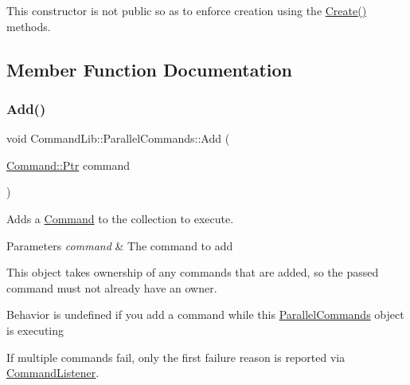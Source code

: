 This constructor is not public so as to enforce creation using the \mbox{\hyperlink{class_command_lib_1_1_parallel_commands_ab75ed6ec91fa1c4652a796a6c0f6868e}{Create()}} methods. 



\subsection{Member Function Documentation}
\mbox{\label{class_command_lib_1_1_parallel_commands_a36085841c237794fc8015ed400e552ad}} 
\subsubsection{\texorpdfstring{Add()}{Add()}}
{\footnotesize\ttfamily void Command\+Lib\+::\+Parallel\+Commands\+::\+Add (\begin{DoxyParamCaption}\item[{\mbox{\hyperlink{class_command_lib_1_1_command_a3b3e4f00144373299df5c6bb1acc319d}{Command\+::\+Ptr}}}]{command }\end{DoxyParamCaption})}



Adds a \mbox{\hyperlink{class_command_lib_1_1_command}{Command}} to the collection to execute.


\begin{DoxyParams}{Parameters}
{\em command} & The command to add\\
\hline
\end{DoxyParams}


This object takes ownership of any commands that are added, so the passed command must not already have an owner. 

Behavior is undefined if you add a command while this \mbox{\hyperlink{class_command_lib_1_1_parallel_commands}{Parallel\+Commands}} object is executing

If multiple commands fail, only the first failure reason is reported via \mbox{\hyperlink{class_command_lib_1_1_command_listener}{Command\+Listener}}.\mbox{\label{class_command_lib_1_1_parallel_commands_aba3f6e3abd06e1483c640eb6d9a82788}} 
